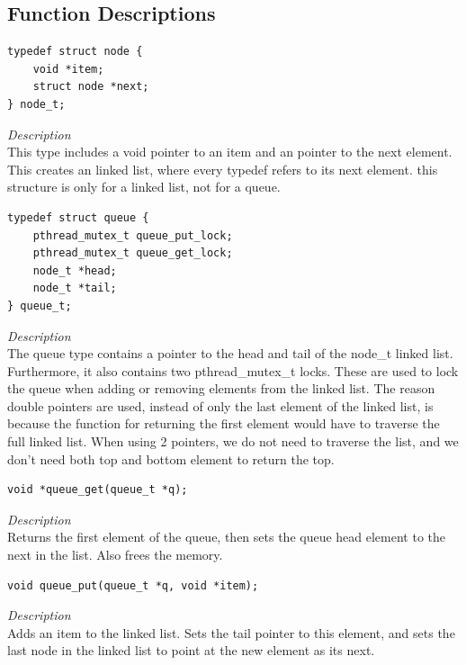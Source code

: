 \documentclass[11pt]{article}
\begin{document}
\subsection{Function Descriptions}


\begin{lstlisting}[style=customc]
typedef struct node {
    void *item;
    struct node *next;
} node_t;
\end{lstlisting}
\textit{Description} \\
This type includes a void pointer to an item and an pointer to the next element.
 This creates an linked list, where every typedef refers to its next element.
 this structure is only for a linked list, not for a queue.



\begin{lstlisting}[style=customc]
typedef struct queue {
    pthread_mutex_t queue_put_lock;
    pthread_mutex_t queue_get_lock;
    node_t *head;
    node_t *tail;
} queue_t;
\end{lstlisting}
\textit{Description} \\
The queue type contains a pointer to the head and tail of the node\_t linked list. Furthermore, it also
contains two pthread\_mutex\_t locks. These are used to lock the queue when adding or removing elements
from the linked list. The reason double pointers are used, instead of only the last element of the linked list, is because the function for returning the first element would have to traverse the full linked list.
When using 2 pointers, we do not need to traverse the list, and we don't need both top and bottom element to return the top.




\begin{lstlisting}[style=customc]
void *queue_get(queue_t *q);
\end{lstlisting}
\textit{Description} \\
Returns the first element of the queue, then sets the queue head element to the next in the list.
Also frees the memory.


\begin{lstlisting}[style=customc]
void queue_put(queue_t *q, void *item);
\end{lstlisting}
\textit{Description} \\
Adds an item to the linked list. Sets the tail pointer to this element, and sets the last node in the linked list to point at the new element as its next.
\end{document}
